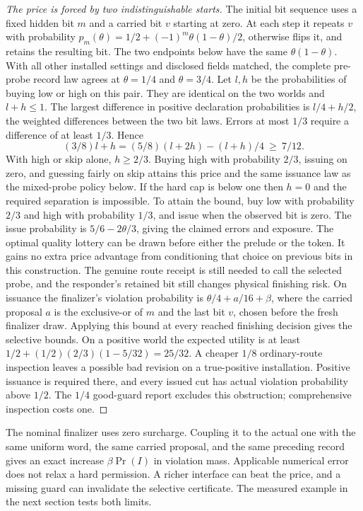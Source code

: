 \begin{proof}[The price is forced by two indistinguishable starts]
The initial bit sequence uses a fixed hidden bit \(m\) and a carried bit \(v\) starting at zero. At each step it repeats \(v\) with probability \(p_m(\theta)=1/2+(-1)^m\theta(1-\theta)/2\), otherwise flips it, and retains the resulting bit. The two endpoints below have the same \(\theta(1-\theta)\). With all other installed settings and disclosed fields matched, the complete pre-probe record law agrees at \(\theta=1/4\) and \(\theta=3/4\). Let \(l,h\) be the probabilities of buying low or high on this pair. They are identical on the two worlds and \(l+h\le1\). The largest difference in positive declaration probabilities is \(l/4+h/2\), the weighted differences between the two bit laws. Errors at most \(1/3\) require a difference of at least \(1/3\). Hence
\[
 (3/8)l+h=(5/8)(l+2h)-(l+h)/4\ \ge\ 7/12 .
\]
With high or skip alone, \(h\ge2/3\). Buying high with probability \(2/3\), issuing on zero, and guessing fairly on skip attains this price and the same issuance law as the mixed-probe policy below. If the hard cap is below one then \(h=0\) and the required separation is impossible. To attain the bound, buy low with probability \(2/3\) and high with probability \(1/3\), and issue when the observed bit is zero. The issue probability is \(5/6-2\theta/3\), giving the claimed errors and exposure. The optimal quality lottery can be drawn before either the prelude or the token. It gains no extra price advantage from conditioning that choice on previous bits in this construction. The genuine route receipt is still needed to call the selected probe, and the responder's retained bit still changes physical finishing risk. On issuance the finalizer's violation probability is \(\theta/4+a/16+\beta\), where the carried proposal \(a\) is the exclusive-or of \(m\) and the last bit \(v\), chosen before the fresh finalizer draw. Applying this bound at every reached finishing decision gives the selective bounds. On a positive world the expected utility is at least \(1/2+(1/2)(2/3)(1-5/32)=25/32\). A cheaper \(1/8\) ordinary-route inspection leaves a possible bad revision on a true-positive installation. Positive issuance is required there, and every issued cut has actual violation probability above \(1/2\). The \(1/4\) good-guard report excludes this obstruction; comprehensive inspection costs one.
\end{proof}
The nominal finalizer uses zero surcharge. Coupling it to the actual one with the same uniform word, the same carried proposal, and the same preceding record gives an exact increase \(\beta\Pr(I)\) in violation mass. Applicable numerical error does not relax a hard permission. A richer interface can beat the price, and a missing guard can invalidate the selective certificate. The measured example in the next section tests both limits.

